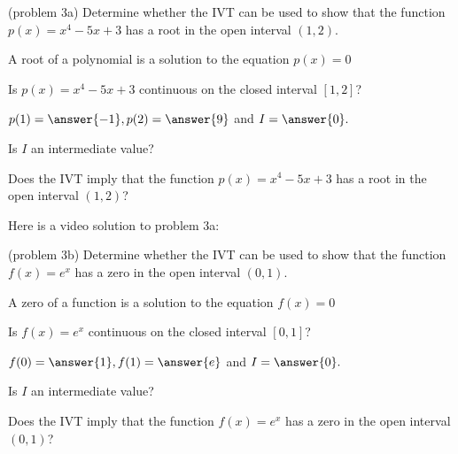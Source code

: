 \documentclass[handout]{ximera}
\begin{document}
\begin{problem}(problem 3a)
Determine whether the IVT can be used to show that the function $p(x) = x^4 - 5x +3$ has a root in the open interval $(1,2)$.\\
\begin{hint}
A root of a polynomial is a solution to the equation $p(x) = 0$
\end{hint}
Is $p(x) = x^4 - 5x + 3$ continuous on the closed interval $[1,2]$? 
\begin{center}
\begin{multipleChoice}
\end{multipleChoice}
\end{center}

$p(1) = \answer{-1}, p(2) = \answer{9}$ and $I = \answer{0}.$

Is $I$ an intermediate value? 
\begin{multipleChoice}
\end{multipleChoice}

Does the IVT imply that the function $p(x) = x^4 - 5x + 3$ has a root in the open interval $(1, 2)$?

\begin{multipleChoice}
\end{multipleChoice}
\end{problem}

Here is a video solution to problem 3a:
\begin{foldable}
\end{foldable}

\begin{problem}(problem 3b)
Determine whether the IVT can be used to show that the function $f(x) = e^x$ has a zero in the open interval $(0,1)$.
\begin{hint}
A zero of a function is a solution to the equation $f(x) = 0$
\end{hint}
Is $f(x) = e^x$ continuous on the closed interval $[0,1]$? 
\begin{center}
\begin{multipleChoice}
\end{multipleChoice}
\end{center}

$f(0) = \answer{1}, f(1) = \answer{e}$ and $I = \answer{0}.$

Is $I$ an intermediate value? 
\begin{multipleChoice}
\end{multipleChoice}

Does the IVT imply that the function $f(x) = e^x$ has a zero in the open interval $(0, 1)$?

\begin{multipleChoice}
\end{multipleChoice}
\end{problem}
\end{document}
